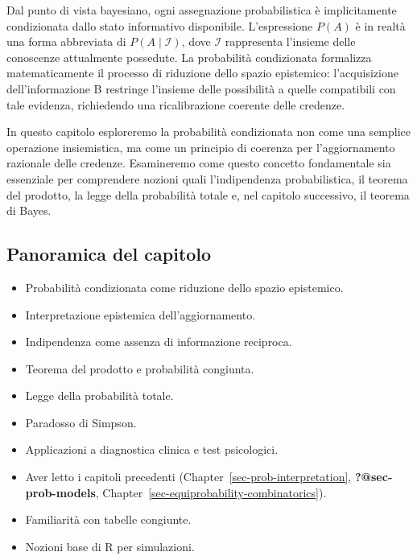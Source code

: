 \documentclass[
  letterpaper,
  DIV=11,
  numbers=noendperiod,
  oneside]{scrreprt}
\providecommand{\tightlist}{%
  \setlength{\itemsep}{0pt}\setlength{\parskip}{0pt}}
\theoremstyle{definition}
\theoremstyle{plain}
\theoremstyle{definition}
\theoremstyle{remark}
\begin{document}
Dal punto di vista bayesiano, ogni assegnazione probabilistica è
implicitamente condizionata dallo stato informativo disponibile.
L'espressione \(P(A)\) è in realtà una forma abbreviata di
\(P(A \mid \mathcal{I})\), dove \(\mathcal{I}\) rappresenta l'insieme
delle conoscenze attualmente possedute. La probabilità condizionata
formalizza matematicamente il processo di riduzione dello spazio
epistemico: l'acquisizione dell'informazione B restringe l'insieme delle
possibilità a quelle compatibili con tale evidenza, richiedendo una
ricalibrazione coerente delle credenze.

In questo capitolo esploreremo la probabilità condizionata non come una
semplice operazione insiemistica, ma come un principio di coerenza per
l'aggiornamento razionale delle credenze. Esamineremo come questo
concetto fondamentale sia essenziale per comprendere nozioni quali
l'indipendenza probabilistica, il teorema del prodotto, la legge della
probabilità totale e, nel capitolo successivo, il teorema di Bayes.

\subsection*{Panoramica del capitolo}\label{panoramica-del-capitolo-3}

\begin{itemize}
\tightlist
\item
  Probabilità condizionata come riduzione dello spazio epistemico.
\item
  Interpretazione epistemica dell'aggiornamento.
\item
  Indipendenza come assenza di informazione reciproca.
\item
  Teorema del prodotto e probabilità congiunta.
\item
  Legge della probabilità totale.
\item
  Paradosso di Simpson.
\item
  Applicazioni a diagnostica clinica e test psicologici.
\end{itemize}

\begin{tcolorbox}[enhanced jigsaw, arc=.35mm, breakable, colbacktitle=quarto-callout-tip-color!10!white, opacityback=0, toprule=.15mm, rightrule=.15mm, colback=white, opacitybacktitle=0.6, leftrule=.75mm, coltitle=black, bottomtitle=1mm, left=2mm, toptitle=1mm, title=\textcolor{quarto-callout-tip-color}{\faLightbulb}\hspace{0.5em}{Prerequisiti}, titlerule=0mm, bottomrule=.15mm, colframe=quarto-callout-tip-color-frame]

\begin{itemize}
\tightlist
\item
  Aver letto i capitoli precedenti
  (Chapter~\ref{sec-prob-interpretation}, \textbf{?@sec-prob-models},
  Chapter~\ref{sec-equiprobability-combinatorics}).
\item
  Familiarità con tabelle congiunte.
\item
  Nozioni base di R per simulazioni.
\end{itemize}

\end{tcolorbox}
\end{document}
